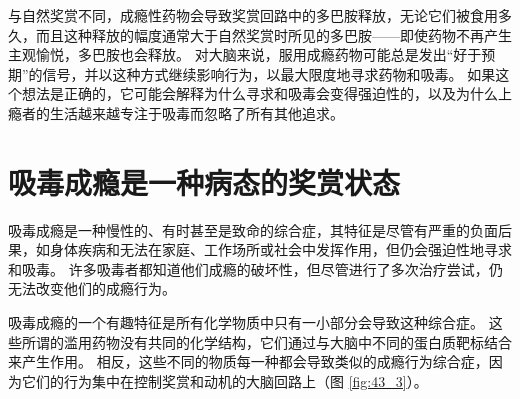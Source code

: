 与自然奖赏不同，成瘾性药物会导致奖赏回路中的多巴胺释放，无论它们被食用多久，而且这种释放的幅度通常大于自然奖赏时所见的多巴胺——即使药物不再产生主观愉悦，多巴胺也会释放。 对大脑来说，服用成瘾药物可能总是发出“好于预期”的信号，并以这种方式继续影响行为，以最大限度地寻求药物和吸毒。 如果这个想法是正确的，它可能会解释为什么寻求和吸毒会变得强迫性的，以及为什么上瘾者的生活越来越专注于吸毒而忽略了所有其他追求。


\section{吸毒成瘾是一种病态的奖赏状态}
吸毒成瘾是一种慢性的、有时甚至是致命的综合症，其特征是尽管有严重的负面后果，如身体疾病和无法在家庭、工作场所或社会中发挥作用，但仍会强迫性地寻求和吸毒。 许多吸毒者都知道他们成瘾的破坏性，但尽管进行了多次治疗尝试，仍无法改变他们的成瘾行为。

吸毒成瘾的一个有趣特征是所有化学物质中只有一小部分会导致这种综合症。 这些所谓的滥用药物没有共同的化学结构，它们通过与大脑中不同的蛋白质靶标结合来产生作用。 
相反，这些不同的物质每一种都会导致类似的成瘾行为综合症，因为它们的行为集中在控制奖赏和动机的大脑回路上（图 \ref{fig:43_3}）。

